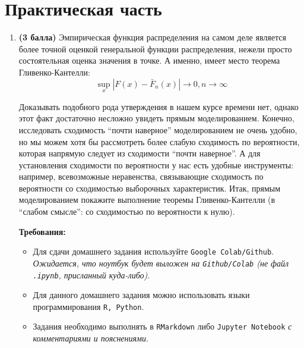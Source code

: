 \documentclass{assignment}
\begin{document}
\section*{Практическая часть}
\begin{enumerate}
    \item \textbf{(3 балла)} Эмпирическая функция распределения на самом деле является более точной оценкой генеральной функции распределения, нежели просто состоятельная оценка значения в точке. А именно, имеет место теорема Гливенко-Кантелли:
    $$\sup_x |F(x) - \bar{F}_n(x)| \to 0, n \to \infty$$

    Доказывать подобного рода утверждения в нашем курсе времени нет, однако этот факт достаточно несложно увидеть прямым моделированием. Конечно, исследовать сходимость “почти наверное” моделированием не очень удобно, но мы можем хотя бы рассмотреть более слабую сходимость по вероятности, которая напрямую следует из сходимости “почти наверное”. А для установления сходимости по вероятности у нас есть удобные инструменты: например, всевозможные неравенства, связывающие сходимость по вероятности со сходимостью выборочных характеристик.
    Итак, прямым моделированием покажите выполнение теоремы Гливенко-Кантелли (в “слабом смысле”: со сходимостью по вероятности к нулю). 

    \textbf{Требования:}
    \begin{itemize}
        \item Для сдачи домашнего задания используйте \texttt{Google Colab/Github}. \textit{Ожидается, что ноутбук будет выложен на \texttt{Github/Colab} (не файл \texttt{.ipynb}, присланный куда-либо)}.
         \item Для данного домашнего задания можно использовать языки программирования \texttt{R, Python}.
         \item Задания необходимо выполнять в \texttt{RMarkdown} либо \texttt{Jupyter Notebook} \textit{с комментариями и пояснениями}.
    \end{itemize}

\end{enumerate}
\end{document}
